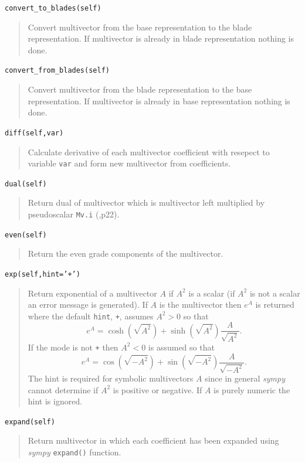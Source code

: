 \documentclass[12pt]{report}
\newcommand{\bfrac}[2]{\displaystyle\frac{#1}{#2}}
\newcommand{\lp}{\left (}
\newcommand{\rp}{\right )}
\newcommand{\f}[2]{{#1}\lp {#2} \rp}
\newcommand{\T}[1]{\texttt{#1}}
\begin{document}
\T{convert\_to\_blades(self)}
\begin{quote}
   Convert multivector from the base representation to the blade representation.
   If multivector is already in blade representation nothing is done.
\end{quote}

\T{convert\_from\_blades(self)}
\begin{quote}
   Convert multivector from the blade representation to the base representation.
   If multivector is already in base representation nothing is done.
\end{quote}

\T{diff(self,var)}
\begin{quote}
   Calculate derivative of each multivector coefficient with resepect to
   variable \T{var} and form new multivector from coefficients.
\end{quote}

\T{dual(self)}
\begin{quote}
   Return dual of multivector which is multivector left multiplied by
   pseudoscalar \T{Mv.i} (\cite{Hestenes},p22).
\end{quote}

\T{even(self)}
\begin{quote}
   Return the even grade components of the multivector.
\end{quote}

\T{exp(self,hint='+')}
\begin{quote}
    Return exponential of a multivector $A$ if $A^{2}$ is a scalar (if $A^{2}$ is not a scalar an 
    error message is generated).  If $A$ is the multivector then $e^{A}$ is returned
    where the default \T{hint}, \T{+}, assumes $A^{2} > 0$ so that 
    \begin{equation*}
    		e^{A} = \f{\cosh}{\sqrt{A^{2}}}+\f{\sinh}{\sqrt{A^{2}}}\bfrac{A}{\sqrt{A^{2}}}.
    \end{equation*}
    If the mode is not \T{+} then $A^{2} < 0$ is assumed so that
    \begin{equation*}
    		e^{A} = \f{\cos}{\sqrt{-A^{2}}}+\f{\sin}{\sqrt{-A^{2}}}\bfrac{A}{\sqrt{-A^{2}}}.
    \end{equation*}
    The hint is required for symbolic multivectors $A$ since in general \emph{sympy} cannot determine if
    $A^{2}$ is positive or negative.  If $A$ is purely numeric the hint is ignored.
\end{quote}

\T{expand(self)}
\begin{quote}
   Return multivector in which each coefficient has been expanded using
   \emph{sympy} \T{expand()} function.
\end{quote}
\end{document}
